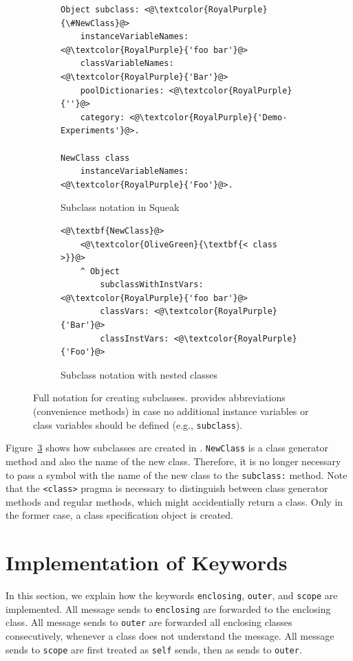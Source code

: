 \begin{figure}[!htp]
\begin{subfigure}[b]{\textwidth}
\begin{lstlisting}
Object subclass: <@\textcolor{RoyalPurple}{\#NewClass}@>
    instanceVariableNames: <@\textcolor{RoyalPurple}{'foo bar'}@>
    classVariableNames: <@\textcolor{RoyalPurple}{'Bar'}@>
    poolDictionaries: <@\textcolor{RoyalPurple}{''}@>
    category: <@\textcolor{RoyalPurple}{'Demo-Experiments'}@>.

NewClass class
	instanceVariableNames: <@\textcolor{RoyalPurple}{'Foo'}@>.
\end{lstlisting}
\caption{Subclass notation in Squeak}
\label{fig:impl_subclass_squeak}
\end{subfigure}

\vspace{15pt}

\begin{subfigure}[b]{\textwidth}
\begin{lstlisting}
<@\textbf{NewClass}@>
    <@\textcolor{OliveGreen}{\textbf{< class >}}@>
    ^ Object 
        subclassWithInstVars: <@\textcolor{RoyalPurple}{'foo bar'}@>
        classVars: <@\textcolor{RoyalPurple}{'Bar'}@>
        classInstVars: <@\textcolor{RoyalPurple}{'Foo'}@>
\end{lstlisting}
\caption{Subclass notation with nested classes}
\label{fig:impl_subclass_nested}
\end{subfigure}
\caption[Notation for creating subclasses]{Full notation for creating subclasses. \msname provides abbreviations (convenience methods) in case no additional instance variables or class variables should be defined (e.g., \texttt{subclass}).}
\end{figure}

Figure~\ref{fig:impl_subclass_nested} shows how subclasses are created in \msname. \texttt{NewClass} is a class generator method and also the name of the new class. Therefore, it is no longer necessary to pass a symbol with the name of the new class to the \texttt{subclass:} method. Note that the \texttt{<class>} pragma is necessary to distinguish between class generator methods and regular methods, which might accidentially return a class. Only in the former case, a class specification object is created.

\section{Implementation of Keywords}
\label{sec:impl_keywords}
In this section, we explain how the keywords \texttt{enclosing}, \texttt{outer}, and \texttt{scope} are implemented. All message sends to \texttt{enclosing} are forwarded to the enclosing class. All message sends to \texttt{outer} are forwarded all enclosing classes consecutively, whenever a class does not understand the message. All message sends to \texttt{scope} are first treated as \texttt{self} sends, then as sends to \texttt{outer}.

